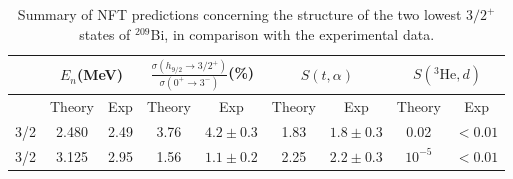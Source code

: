 \begin{table}
	\begin{tabular}{|c|c|c|c|c|c|c|c|c|}
		\hline
		& \multicolumn{2}{|c}{$E_n$(MeV)} & \multicolumn{2}{|c}{$\frac{\sigma(h_{9/2}\rightarrow 3/2^+)}{\sigma(0^+\rightarrow 3^-)}$(\%)} & \multicolumn{2}{|c}{$S(t,\alpha)$}  & \multicolumn{2}{|c|}{$S(^3\text{He},d)$}   \\
		\hline
		&Theory  & Exp  & Theory  & Exp & Theory & Exp & Theory  & Exp  \\
		\hline
		3/2& 2.480 & 2.49  & 3.76  & $4.2\pm0.3$  & 1.83  & $1.8\pm0.3$ &0.02  & $<0.01$  \\
		3/2& 3.125 & 2.95  & 1.56 & $1.1\pm0.2$  & 2.25  & $2.2\pm0.3$ & $10^{-5}$  & $<0.01$  \\
		\hline
	\end{tabular}\caption{Summary of NFT predictions concerning the structure of the two lowest $3/2^+$ states of $^{209}$Bi, in comparison with the experimental data.}\label{tabintroC3}
\end{table}






